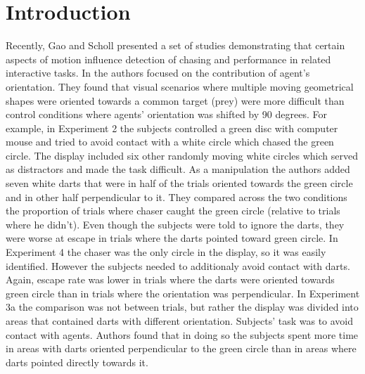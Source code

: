 \documentclass{article}
\begin{document}
\section{Introduction}



Recently, Gao and Scholl presented a set of studies \citep{gao09,gao10,gao11} demonstrating that certain aspects of motion influence detection of chasing and performance in related interactive tasks. In \citet{gao10} the authors focused on the contribution of agent's orientation. They found that visual scenarios where multiple moving geometrical shapes were oriented towards a common target (prey) were more difficult than control conditions where agents' orientation was shifted by 90 degrees. For example, in Experiment 2 the subjects controlled a green disc with computer mouse and tried to avoid contact with a white circle which chased the green circle. The display included six other randomly moving white circles which served as distractors and made the task difficult. As a manipulation the authors added seven white darts that were in half of the trials oriented towards the green circle and in other half perpendicular to it. They compared across the two conditions the proportion of trials where chaser caught the green circle (relative to trials where he didn't). Even though the subjects were told to ignore the darts, they were worse at escape in trials where the darts pointed toward green circle. In Experiment 4 the chaser was the only circle in the display, so it was easily identified. However the subjects needed to additionaly avoid contact with darts. Again, escape rate was lower in trials where the darts were oriented towards green circle than in trials where the orientation was perpendicular. In Experiment 3a the comparison was not between trials, but rather the display was divided into areas that contained darts with different orientation. Subjects' task was to avoid contact with agents. Authors found that in doing so the subjects spent more time in areas with darts oriented perpendicular to the green circle than in areas where darts pointed directly towards it.\\
\end{document}
